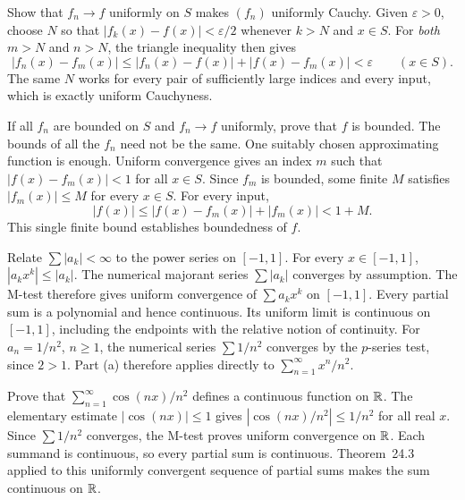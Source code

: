 \goal Show that $f_n\to f$ uniformly on $S$ makes $(f_n)$ uniformly Cauchy.
Given $\varepsilon>0$, choose $N$ so that
$|f_k(x)-f(x)|<\varepsilon/2$ whenever $k>N$ and $x\in S$.
For \emph{both} $m>N$ and $n>N$, the triangle inequality then gives
\[
 |f_n(x)-f_m(x)|\le |f_n(x)-f(x)|+|f(x)-f_m(x)|<\varepsilon
 \qquad(x\in S).
\]
The same $N$ works for every pair of sufficiently large indices and every input,
which is exactly uniform Cauchyness.

\goal If all $f_n$ are bounded on $S$ and $f_n\to f$ uniformly, prove that $f$ is bounded.
\idea The bounds of all the $f_n$ need not be the same. One suitably chosen
approximating function is enough.
Uniform convergence gives an index $m$ such that $|f(x)-f_m(x)|<1$ for all
$x\in S$. Since $f_m$ is bounded, some finite $M$ satisfies
$|f_m(x)|\le M$ for every $x\in S$.
For every input,
\[
 |f(x)|\le |f(x)-f_m(x)|+|f_m(x)|<1+M.
\]
This single finite bound establishes boundedness of $f$.

\goal Relate $\sum|a_k|<\infty$ to the power series on $[-1,1]$.
For every $x\in[-1,1]$, $|a_kx^k|\le|a_k|$.
The numerical majorant series $\sum|a_k|$ converges by assumption.
The M-test therefore gives uniform convergence of $\sum a_kx^k$ on $[-1,1]$.
Every partial sum is a polynomial and hence continuous. Its uniform limit is
continuous on $[-1,1]$, including the endpoints with the relative notion of continuity.
For $a_n=1/n^2$, $n\ge1$, the numerical series $\sum1/n^2$ converges
by the $p$-series test, since $2>1$.
Part (a) therefore applies directly to $\sum_{n=1}^\infty x^n/n^2$.

\goal Prove that $\sum_{n=1}^\infty\cos(nx)/n^2$ defines a continuous function on $\mathbb{R}$.
The elementary estimate $|\cos(nx)|\le1$ gives
$|\cos(nx)/n^2|\le1/n^2$ for all real $x$.
Since $\sum1/n^2$ converges, the M-test proves uniform convergence on $\mathbb{R}$.
Each summand is continuous, so every partial sum is continuous.
Theorem~24.3 applied to this uniformly convergent sequence of partial sums
makes the sum continuous on $\mathbb{R}$.


